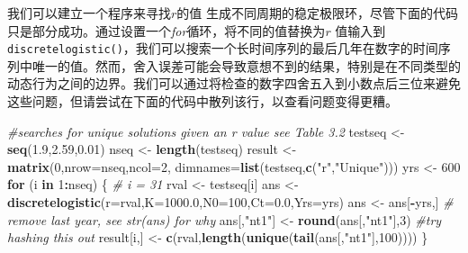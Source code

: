 \documentclass[
  lang=cn,
  11pt,
  scheme=chinese,
  chinesefont=nofont,
  citestyle=gb7714-2015,
  bibstyle=gb7714-2015]{elegantbook}
\newenvironment{Shaded}{\begin{snugshade}}{\end{snugshade}}
\newcommand{\AttributeTok}[1]{\textcolor[rgb]{0.13,0.29,0.53}{#1}}
\newcommand{\CommentTok}[1]{\textcolor[rgb]{0.56,0.35,0.01}{\textit{#1}}}
\newcommand{\ControlFlowTok}[1]{\textcolor[rgb]{0.13,0.29,0.53}{\textbf{#1}}}
\newcommand{\DecValTok}[1]{\textcolor[rgb]{0.00,0.00,0.81}{#1}}
\newcommand{\FloatTok}[1]{\textcolor[rgb]{0.00,0.00,0.81}{#1}}
\newcommand{\FunctionTok}[1]{\textcolor[rgb]{0.13,0.29,0.53}{\textbf{#1}}}
\newcommand{\NormalTok}[1]{#1}
\newcommand{\OtherTok}[1]{\textcolor[rgb]{0.56,0.35,0.01}{#1}}
\newcommand{\SpecialCharTok}[1]{\textcolor[rgb]{0.81,0.36,0.00}{\textbf{#1}}}
\newcommand{\StringTok}[1]{\textcolor[rgb]{0.31,0.60,0.02}{#1}}
\begin{document}
我们可以建立一个程序来寻找\(r\)的值 生成不同周期的稳定极限环，尽管下面的代码只是部分成功。通过设置一个\emph{for}循环，将不同的值替换为\(r\) 值输入到\texttt{discretelogistic()}，我们可以搜索一个长时间序列的最后几年在数字的时间序列中唯一的值。然而，舍入误差可能会导致意想不到的结果，特别是在不同类型的动态行为之间的边界。我们可以通过将检查的数字四舍五入到小数点后三位来避免这些问题，但请尝试在下面的代码中散列该行，以查看问题变得更糟。

\begin{Shaded}
\begin{Highlighting}[]
\CommentTok{\#searches for unique solutions given an r value  see Table 3.2}
\NormalTok{testseq }\OtherTok{\textless{}{-}} \FunctionTok{seq}\NormalTok{(}\FloatTok{1.9}\NormalTok{,}\FloatTok{2.59}\NormalTok{,}\FloatTok{0.01}\NormalTok{)  }
\NormalTok{nseq }\OtherTok{\textless{}{-}} \FunctionTok{length}\NormalTok{(testseq)  }
\NormalTok{result }\OtherTok{\textless{}{-}} \FunctionTok{matrix}\NormalTok{(}\DecValTok{0}\NormalTok{,}\AttributeTok{nrow=}\NormalTok{nseq,}\AttributeTok{ncol=}\DecValTok{2}\NormalTok{,  }
                 \AttributeTok{dimnames=}\FunctionTok{list}\NormalTok{(testseq,}\FunctionTok{c}\NormalTok{(}\StringTok{"r"}\NormalTok{,}\StringTok{"Unique"}\NormalTok{)))  }
\NormalTok{yrs }\OtherTok{\textless{}{-}} \DecValTok{600}  
\ControlFlowTok{for}\NormalTok{ (i }\ControlFlowTok{in} \DecValTok{1}\SpecialCharTok{:}\NormalTok{nseq) \{  }\CommentTok{\# i = 31  }
\NormalTok{   rval }\OtherTok{\textless{}{-}}\NormalTok{ testseq[i]  }
\NormalTok{   ans }\OtherTok{\textless{}{-}} \FunctionTok{discretelogistic}\NormalTok{(}\AttributeTok{r=}\NormalTok{rval,}\AttributeTok{K=}\FloatTok{1000.0}\NormalTok{,}\AttributeTok{N0=}\DecValTok{100}\NormalTok{,}\AttributeTok{Ct=}\FloatTok{0.0}\NormalTok{,}\AttributeTok{Yrs=}\NormalTok{yrs)  }
\NormalTok{   ans }\OtherTok{\textless{}{-}}\NormalTok{ ans[}\SpecialCharTok{{-}}\NormalTok{yrs,] }\CommentTok{\# remove last year, see str(ans) for why  }
\NormalTok{   ans[,}\StringTok{"nt1"}\NormalTok{] }\OtherTok{\textless{}{-}} \FunctionTok{round}\NormalTok{(ans[,}\StringTok{"nt1"}\NormalTok{],}\DecValTok{3}\NormalTok{) }\CommentTok{\#try hashing this out  }
\NormalTok{   result[i,] }\OtherTok{\textless{}{-}} \FunctionTok{c}\NormalTok{(rval,}\FunctionTok{length}\NormalTok{(}\FunctionTok{unique}\NormalTok{(}\FunctionTok{tail}\NormalTok{(ans[,}\StringTok{"nt1"}\NormalTok{],}\DecValTok{100}\NormalTok{))))  }
\NormalTok{\}  }
\end{Highlighting}
\end{Shaded}
\end{document}
